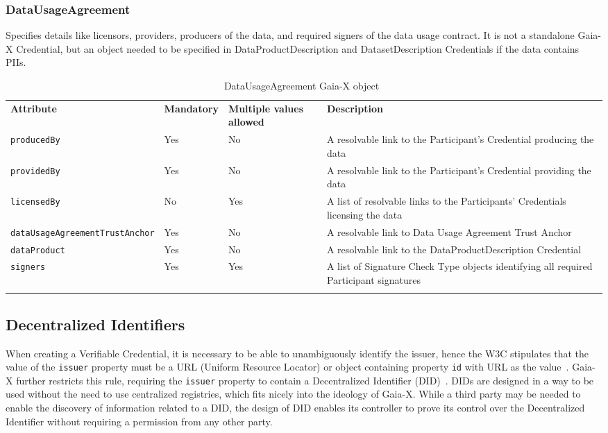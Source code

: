 \subsubsection{DataUsageAgreement}

Specifies details like licensors, providers, producers of the data, and required signers of the data usage contract.
It is not a standalone Gaia-X Credential, but an object needed to be specified in DataProductDescription and DatasetDescription Credentials if the data contains PIIs.

\begin{longtable}{ |p{4cm}|p{2cm}|p{2cm}|p{7cm}| }
    \hhline{----}
    \textbf{Attribute} & \textbf{Mandatory} & \textbf{Multiple values allowed} & \textbf{Description}\\
    \hhline{----}
    \texttt{producedBy} & Yes & No & A resolvable link to the Participant's Credential producing the data\\
    \hhline{----}
    \texttt{providedBy} & Yes & No & A resolvable link to the Participant's Credential providing the data\\
    \hhline{----}
    \texttt{licensedBy} & No & Yes & A list of resolvable links to the Participants' Credentials licensing the data\\
    \hhline{----}
    \texttt{dataUsageAgreementTrustAnchor} & Yes & No & A resolvable link to Data Usage Agreement Trust Anchor\\
    \hhline{----}
    \texttt{dataProduct} & Yes & No & A resolvable link to the DataProductDescription Credential\\
    \hhline{----}
    \texttt{signers} & Yes & Yes & A list of Signature Check Type objects identifying all required Participant signatures\\
    \hhline{----}
    \caption{DataUsageAgreement Gaia-X object~\cite{gaiax_data_exchange_document}}
    \label{tab:data_usage_agreement}
\end{longtable}

\subsection{Decentralized Identifiers}\label{subsec:decentralized-identifiers}

When creating a Verifiable Credential, it is necessary to be able to unambiguously identify the issuer, hence the W3C stipulates that the value of the \texttt{issuer} property must be a URL (Uniform Resource Locator) or object containing property \texttt{id} with URL as the value~\cite{verifiable_credentials}.
Gaia-X further restricts this rule, requiring the \texttt{issuer} property to contain a Decentralized Identifier (DID)~\cite{did}.
DIDs are designed in a way to be used without the need to use centralized registries, which fits nicely into the ideology of Gaia-X.
While a third party may be needed to enable the discovery of information related to a DID, the design of DID enables its controller to prove its control over the Decentralized Identifier without requiring a permission from any other party.

